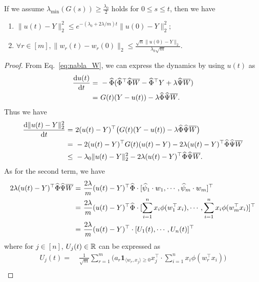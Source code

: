 \begin{lemma}\label{lem:gradient_flow_2}
If we assume $\lambda_{\min}(G(s))\geq \frac{\lambda_0}{2}$ holds for $0\leq s\leq t$, then we have
\begin{enumerate}
    \item $\|u(t) - Y\|_2^2 \leq e^{-(\lambda_0+2\lambda/m) t} \|u(0) - Y\|_2^2;$
    \item $\forall r\in [m], \|w_r(t) - w_r(0)\|_2 \leq \frac{\sqrt{n}\|u(0) - Y\|_2}{\lambda_0 \sqrt{m}}.$
\end{enumerate}
\end{lemma}
\begin{proof}
From Eq.~\eqref{eq:nabla_W}, we can express the dynamics by using $u(t)$ as
\begin{align}
    \label{eq:d_u}
    \frac{\d u(t)}{\d t} = & ~ - \hat{\Phi} (\hat{\Phi}^{\top}\hat{\Phi} \overline{W} - \hat{\Phi}^{\top} Y + \lambda\hat{\Psi} \overline{W}) \notag \\
    = & ~ G(t) (Y - u(t)) - \lambda \hat{\Phi} \hat{\Psi} \overline{W}.
\end{align}
Thus we have
\begin{align}
    \label{eq:d_y_u}
    \frac{\d \|u(t) - Y\|_2^2}{\d t} = & ~ 2(u(t) - Y)^\top \big(G(t) (Y - u(t)) - \lambda \hat{\Phi} \hat{\Psi} \overline{W} \big) \notag \\
    = & ~ -2 (u(t) - Y)^\top G(t) (u(t) - Y) - 2\lambda (u(t) - Y)^\top\hat{\Phi} \hat{\Psi} \overline{W} \notag \\
    \leq & ~ - \lambda_0 \|u(t) - Y\|_2^2- 2\lambda (u(t) - Y)^\top\hat{\Phi} \hat{\Psi} \overline{W}.
\end{align}
As for the second term, we have
\begin{align}
    \label{eq:phi_psi_W}
    2\lambda (u(t) - Y)^\top\hat{\Phi} \hat{\Psi} \overline{W} = & ~ \frac{2\lambda}{m} (u(t) - Y)^\top\hat{\Phi}\cdot [\hat{\psi}_1\cdot w_1, \cdots, \hat{\psi}_m\cdot w_m]^\top \notag \\
    = & ~ \frac{2\lambda}{m} (u(t) - Y)^\top\hat{\Phi}\cdot [\sum_{i=1}^n x_i \phi(w_1^\top x_i), \cdots, \sum_{i=1}^n x_i \phi(w_m^\top x_i)]^\top \notag \\
    = & ~ \frac{2\lambda}{m} (u(t) - Y)^\top \cdot [U_1(t),\cdots, U_n(t)]^\top
\end{align}
where for $j\in [n]$, $U_j(t)\in\mathbb{R}$ can be expressed as
\begin{align*}
    U_j(t) = & ~ \frac{1}{\sqrt{m}}\sum_{r=1}^m \big(a_r \mathbf{1}_{\langle w_r, x_j \rangle \geq 0}x_j^\top \cdot \sum_{i=1}^n x_i \phi(w_r^\top x_i)\big) \\

\end{align*}
\end{proof}
